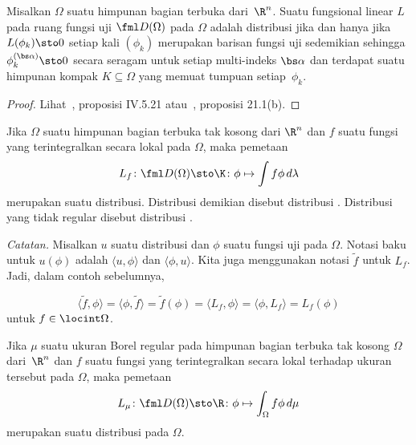 \begin{prop} Misalkan $\Omega$ suatu himpunan bagian terbuka dari~$\R^n$. Suatu fungsional linear $L$ pada ruang fungsi uji $\fml D(\Omega)$ pada $\Omega$ adalah
distribusi jika dan hanya jika $L(\phi_k) \sto 0$ setiap kali $(\phi_k)$ merupakan barisan fungsi uji sedemikian sehingga $\phi_k^{(\bs\alpha)} \sto 0$
secara seragam untuk setiap multi-indeks $\bs\alpha$ dan terdapat suatu himpunan kompak $K \subseteq \Omega$ yang memuat tumpuan setiap~$\phi_k$.
\end{prop}

\begin{proof} Lihat~\cite{Conway:1990}, proposisi IV.5.21 atau~\cite{Treves:1967}, proposisi 21.1(b).  \ns
\end{proof}

\begin{exam} Jika $\Omega$ suatu himpunan bagian terbuka tak kosong dari $\R^n$ dan $f$ suatu fungsi yang terintegralkan secara lokal pada $\Omega$, maka pemetaan
   \[ L_f\colon \fml D(\Omega) \sto \K \colon \phi \mapsto \int f\phi\,d\lambda \]
merupakan suatu distribusi. Distribusi demikian disebut
distribusi . Distribusi yang tidak regular disebut
distribusi .
\end{exam}

\emph{Catatan.} Misalkan $u$ suatu distribusi dan $\phi$ suatu fungsi uji pada $\Omega$. Notasi baku untuk $u(\phi)$ adalah
$\langle u,\phi \rangle$ dan $\langle \phi,u \rangle$. Kita juga menggunakan
notasi $\tilde f$ untuk $L_f$. Jadi, dalam contoh sebelumnya,

    \[ \langle \tilde f,\phi \rangle = \langle \phi,\tilde f \rangle
            = \tilde f(\phi) = \langle L_f,\phi \rangle
            = \langle \phi,L_f \rangle = L_f(\phi) \]
untuk $f \in \locint\Omega$.

\begin{exam} Jika $\mu$ suatu ukuran Borel regular pada himpunan bagian terbuka tak kosong $\Omega$ dari~$\R^n$ dan $f$ suatu fungsi yang terintegralkan secara lokal
terhadap ukuran tersebut pada $\Omega$, maka pemetaan
    \[ L_\mu\colon \fml D(\Omega) \sto \R\colon \phi \mapsto \int_\Omega f\phi \,d\mu \]
merupakan suatu distribusi pada $\Omega$.
\end{exam}

